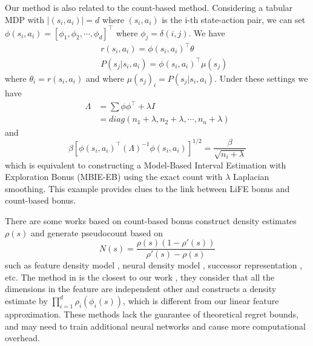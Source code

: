 Our method is also related to the count-based method. Considering a tabular MDP with $ | {(s_i, a_i)} | = d $ where $(s_i,a_i)$ is the i-th state-action pair, we can set $ \phi (s_i, a_i) = [\phi_1, \phi_2, \cdots, \phi_d]^\top $ where $ \phi_j = \delta (i, j) $. We have 
\begin{eqnarray}
    && r(s_i, a_i) = \phi (s_i, a_i) ^ \top \theta\\
    && P(s_j | s_i, a_i) = \phi (s_i, a_i) ^ \top \mu (s_j) 
\end{eqnarray} 
 where $ \theta_i = r(s_i,a_i)$ and  where $ \mu (s_j)_i = P (s_j | s_i, a_i)$. Under these settings we have
 \begin{align}
 \Lambda &= \sum \phi \phi ^ \top + \lambda I \\
 &=diag (n_1 + \lambda, n_2 + \lambda, \cdots , n_n + \lambda)
 \end{align}
and 
 \[ \beta [\phi (s_i, a_i) ^ \top (\Lambda) ^ {-1} \phi (s_i, a_i)] ^ {1/2} = \frac{\beta} {\sqrt{n_i + \lambda}} \]
 which is equivalent to constructing a Model-Based Interval Estimation with Exploration Bonus (MBIE-EB) \cite{strehl2008analysis} using the exact count with $\lambda$ Laplacian smoothing. This example provides clues to the link between LiFE bonus and count-based bonus.

 There are some works based on count-based bonus construct density estimates $ \rho (s) $ and generate pseudocount based on 
 \[N (s) = \frac{\rho(s)(1-\rho'(s))}{\rho'(s)-\rho(s)}\]
 such as feature density model \cite{martin2017count}, neural density model \cite{ostrovski2017count}, successor representation \cite{machado2018count}, etc. The method in \cite{martin2017count} is the closest to our work , they consider that all the dimensions in the feature are independent other and constructs a density estimate by $\prod_{i=1}^d\rho_i(\phi_i(s))$, which is different from our linear feature approximation. These methods lack the guarantee of theoretical regret bounds, and may need to train additional neural networks and cause more computational overhead.